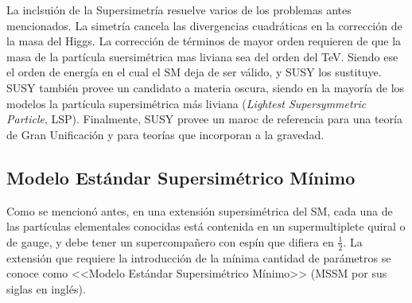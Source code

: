 

La inclsuión de la Supersimetría resuelve varios de los problemas antes mencionados. La simetría cancela las divergencias cuadráticas en la corrección de la masa del Higgs. La corrección de términos de mayor orden requieren de que la masa de la partícula suersimétrica mas liviana sea del orden del TeV. Siendo ese el orden de energía en el cual el SM deja de ser válido, y SUSY los sustituye. SUSY también provee un candidato a materia oscura, siendo en la mayoría de los modelos la partícula supersimétrica más liviana (\textit{Lightest Supersymmetric Particle}, LSP). Finalmente, SUSY provee un maroc de referencia para una teoría de Gran Unificación y para teorías que incorporan a la gravedad. 



\subsection{Modelo Estándar Supersimétrico Mínimo}

Como se mencionó antes, en una extensión supersimétrica del SM, cada una de las partículas elementales conocidas está contenida en un supermultiplete quiral o de gauge, y debe tener un supercompañero con espín que difiera en $\frac{1}{2}$. La extensión que requiere la introducción de la mínima cantidad de parámetros se conoce como <<Modelo Estándar Supersimétrico Mínimo>> (MSSM por sus siglas en inglés).

